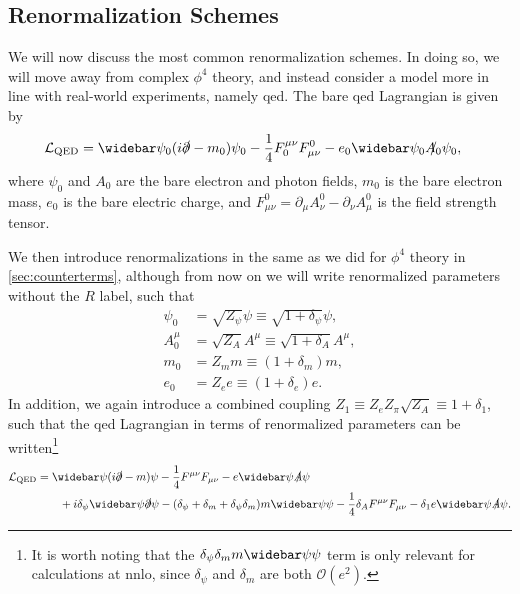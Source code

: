 \subsection{Renormalization Schemes}\label{sec:renormalization_schemes}
We will now discuss the most common renormalization schemes.
In doing so, we will move away from complex $\phi^4$ theory, and instead consider a model more in line with real-world experiments, namely \gls{qed}. The bare \gls{qed} Lagrangian is given by 
\begin{align}
    \mathcal{L}_{\mathrm{QED}} &= \widebar\psi_0 (i\slashed{\partial} - m_0) \psi_0 - \frac{1}{4}F_0^{\mu\nu}F^0_{\mu\nu} - e_0\widebar\psi_0\slashed{A_0}\psi_0,
\end{align}
where $\psi_0$ and $A_0$ are the bare electron and photon fields, $m_0$ is the bare electron mass, $e_0$ is the bare electric charge, and $F^0_{\mu\nu} = \partial_\mu A^0_\nu - \partial_\nu A^0_\mu$ is the field strength tensor.

We then introduce renormalizations in the same as we did for $\phi^4$ theory in \cref{sec:counterterms}, although from now on we will write renormalized parameters without the $R$ label, such that
\begin{subequations}
\begin{align}
    \psi_0 &= \sqrt{Z_\psi}\psi \equiv \sqrt{1+\delta_\psi}\psi,
    \\
    A_0^\mu &= \sqrt{Z_A}A^\mu \equiv \sqrt{1+\delta_A}A^\mu,
    \\
    m_0 &= Z_m m \equiv (1+\delta_m) m,
    \\
    e_0 &= Z_e e \equiv (1+\delta_e) e.
\end{align}
\end{subequations}
In addition, we again introduce a combined coupling $Z_1 \equiv Z_e Z_\pi \sqrt{Z_A} \equiv 1+\delta_1$, such that the \gls{qed} Lagrangian in terms of renormalized parameters can be written\footnote{It is worth noting that the $\delta_\psi\delta_m m\widebar\psi\psi$ term is only relevant for calculations at \gls{nnlo}, since $\delta_\psi$ and $\delta_m$ are both $\mathcal{O}(e^2)$.}
\begin{equation}
\label{eq:qed_lagrangian_ct}
\begin{split}
    \mathcal{L}_{\mathrm{QED}} &= \widebar\psi (i\slashed{\partial} - m) \psi - \frac{1}{4}F^{\mu\nu}F_{\mu\nu} - e\widebar\psi\slashed{A}\psi
    \\ &\qquad
    + i\delta_\psi \widebar\psi \slashed{\partial} \psi - (\delta_\psi + \delta_m + \delta_\psi\delta_m) m\widebar\psi\psi - \frac{1}{4}\delta_A F^{\mu\nu} F_{\mu\nu} - \delta_1 e\widebar\psi\slashed{A}\psi.
\end{split}
\end{equation}

